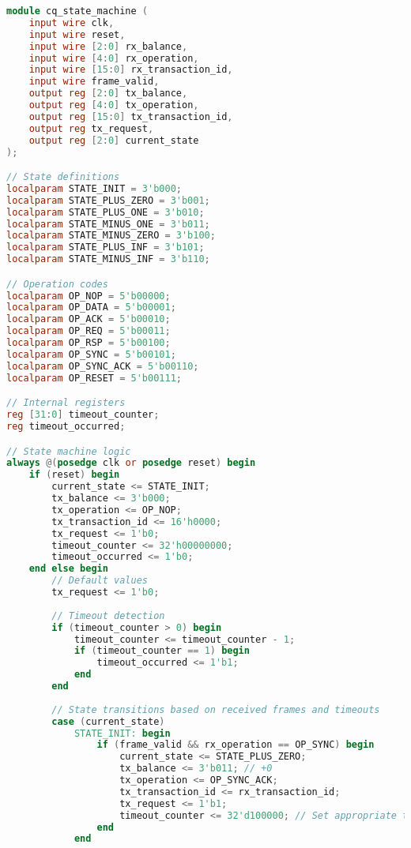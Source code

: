 \documentclass[../../../OAE-SPEC-MAIN.tex]{subfiles}
\begin{document}
\begin{lstlisting}[language=Verilog]
module cq_state_machine (
    input wire clk,
    input wire reset,
    input wire [2:0] rx_balance,
    input wire [4:0] rx_operation,
    input wire [15:0] rx_transaction_id,
    input wire frame_valid,
    output reg [2:0] tx_balance,
    output reg [4:0] tx_operation,
    output reg [15:0] tx_transaction_id,
    output reg tx_request,
    output reg [2:0] current_state
);

// State definitions
localparam STATE_INIT = 3'b000;
localparam STATE_PLUS_ZERO = 3'b001;
localparam STATE_PLUS_ONE = 3'b010;
localparam STATE_MINUS_ONE = 3'b011;
localparam STATE_MINUS_ZERO = 3'b100;
localparam STATE_PLUS_INF = 3'b101;
localparam STATE_MINUS_INF = 3'b110;

// Operation codes
localparam OP_NOP = 5'b00000;
localparam OP_DATA = 5'b00001;
localparam OP_ACK = 5'b00010;
localparam OP_REQ = 5'b00011;
localparam OP_RSP = 5'b00100;
localparam OP_SYNC = 5'b00101;
localparam OP_SYNC_ACK = 5'b00110;
localparam OP_RESET = 5'b00111;

// Internal registers
reg [31:0] timeout_counter;
reg timeout_occurred;

// State machine logic
always @(posedge clk or posedge reset) begin
    if (reset) begin
        current_state <= STATE_INIT;
        tx_balance <= 3'b000;
        tx_operation <= OP_NOP;
        tx_transaction_id <= 16'h0000;
        tx_request <= 1'b0;
        timeout_counter <= 32'h00000000;
        timeout_occurred <= 1'b0;
    end else begin
        // Default values
        tx_request <= 1'b0;
        
        // Timeout detection
        if (timeout_counter > 0) begin
            timeout_counter <= timeout_counter - 1;
            if (timeout_counter == 1) begin
                timeout_occurred <= 1'b1;
            end
        end
        
        // State transitions based on received frames and timeouts
        case (current_state)
            STATE_INIT: begin
                if (frame_valid && rx_operation == OP_SYNC) begin
                    current_state <= STATE_PLUS_ZERO;
                    tx_balance <= 3'b011; // +0
                    tx_operation <= OP_SYNC_ACK;
                    tx_transaction_id <= rx_transaction_id;
                    tx_request <= 1'b1;
                    timeout_counter <= 32'd100000; // Set appropriate timeout value
                end
            end
            

\end{lstlisting}
\end{document}
